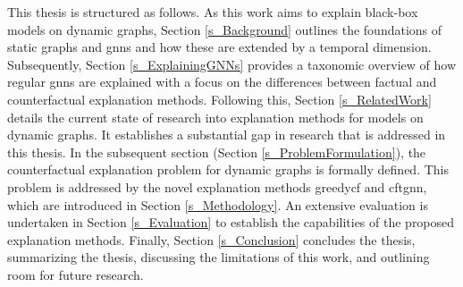 This thesis is structured as follows. As this work aims to explain black-box models on dynamic graphs, Section \ref{s_Background} outlines the foundations of static graphs and \glspl{gnn} and how these are extended by a temporal dimension. Subsequently, Section \ref{s_ExplainingGNNs} provides a taxonomic overview of how regular \glspl{gnn} are explained with a focus on the differences between factual and counterfactual explanation methods. Following this, Section \ref{s_RelatedWork} details the current state of research into explanation methods for models on dynamic graphs. It establishes a substantial gap in research that is addressed in this thesis. In the subsequent section (Section \ref{s_ProblemFormulation}), the counterfactual explanation problem for dynamic graphs is formally defined. This problem is addressed by the novel explanation methods \gls{greedycf} and \gls{cftgnn}, which are introduced in Section \ref{s_Methodology}. An extensive evaluation is undertaken in Section \ref{s_Evaluation} to establish the capabilities of the proposed explanation methods. Finally, Section \ref{s_Conclusion} concludes the thesis, summarizing the thesis, discussing the limitations of this work, and outlining room for future research.

